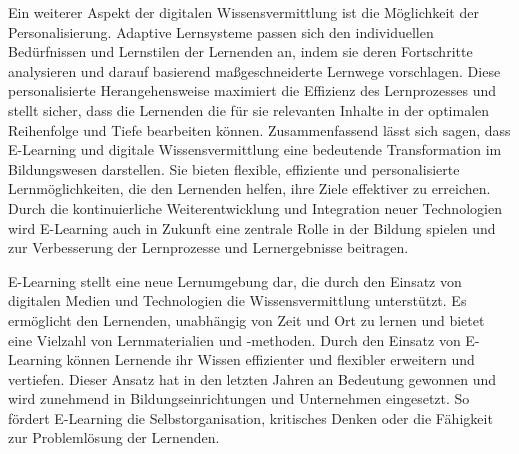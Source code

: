 Ein weiterer Aspekt der digitalen Wissensvermittlung ist die Möglichkeit der Personalisierung. Adaptive Lernsysteme passen sich den individuellen Bedürfnissen und Lernstilen der Lernenden an, indem sie deren Fortschritte analysieren und darauf basierend maßgeschneiderte Lernwege vorschlagen. Diese personalisierte Herangehensweise maximiert die Effizienz des Lernprozesses und stellt sicher, dass die Lernenden die für sie relevanten Inhalte in der optimalen Reihenfolge und Tiefe bearbeiten können.
Zusammenfassend lässt sich sagen, dass E-Learning und digitale Wissensvermittlung eine bedeutende Transformation im Bildungswesen darstellen. Sie bieten flexible, effiziente und personalisierte Lernmöglichkeiten, die den Lernenden helfen, ihre Ziele effektiver zu erreichen. Durch die kontinuierliche Weiterentwicklung und Integration neuer Technologien wird E-Learning auch in Zukunft eine zentrale Rolle in der Bildung spielen und zur Verbesserung der Lernprozesse und Lernergebnisse beitragen.

E-Learning stellt eine neue Lernumgebung dar, die durch den Einsatz von digitalen Medien und 
Technologien die Wissensvermittlung unterstützt. Es ermöglicht den Lernenden, unabhängig von Zeit und 
Ort zu lernen und bietet eine Vielzahl von Lernmaterialien und -methoden. %
Durch den Einsatz von E-Learning können Lernende ihr Wissen effizienter und flexibler erweitern und vertiefen. %
Dieser Ansatz hat in den letzten Jahren an Bedeutung gewonnen und wird zunehmend in 
Bildungseinrichtungen und Unternehmen eingesetzt. So fördert E-Learning die Selbstorganisation, kritisches
Denken oder die Fähigkeit zur Problemlösung der Lernenden. 

